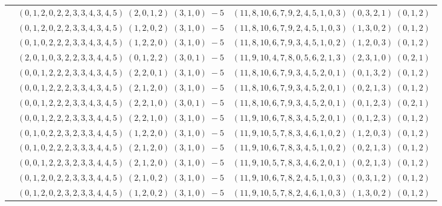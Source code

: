 \documentclass[11pt]{article}
\begin{document}
\begin{longtable}[l]{|c|c|c|}
 \cline{2-3} 
 & $(0 ,1 ,2 ,0 ,2 ,2 ,3 ,3 ,4 ,3 ,4 ,5) \;(2 ,0 ,1 ,2) \;(3 ,1 ,0) \;-5$ & $(11 ,8 ,10 ,6 ,7 ,9 ,2 ,4 ,5 ,1 ,0 ,3) \;(0 ,3 ,2 ,1) \;(0 ,1 ,2) \;$\\ 
 \cline{2-3} 
 & $(0 ,1 ,2 ,0 ,2 ,2 ,3 ,3 ,4 ,3 ,4 ,5) \;(1 ,2 ,0 ,2) \;(3 ,1 ,0) \;-5$ & $(11 ,8 ,10 ,6 ,7 ,9 ,2 ,4 ,5 ,1 ,0 ,3) \;(1 ,3 ,0 ,2) \;(0 ,1 ,2) \;$\\ 
 \cline{2-3} 
 & $(0 ,1 ,0 ,2 ,2 ,2 ,3 ,3 ,4 ,3 ,4 ,5) \;(1 ,2 ,2 ,0) \;(3 ,1 ,0) \;-5$ & $(11 ,8 ,10 ,6 ,7 ,9 ,3 ,4 ,5 ,1 ,0 ,2) \;(1 ,2 ,0 ,3) \;(0 ,1 ,2) \;$\\ 
 \cline{2-3} 
 & $(2 ,0 ,1 ,0 ,3 ,2 ,2 ,3 ,3 ,4 ,4 ,5) \;(0 ,1 ,2 ,2) \;(3 ,0 ,1) \;-5$ & $(11 ,9 ,10 ,4 ,7 ,8 ,0 ,5 ,6 ,2 ,1 ,3) \;(2 ,3 ,1 ,0) \;(0 ,2 ,1) \;$\\ 
 \cline{2-3} 
 & $(0 ,0 ,1 ,2 ,2 ,2 ,3 ,3 ,4 ,3 ,4 ,5) \;(2 ,2 ,0 ,1) \;(3 ,1 ,0) \;-5$ & $(11 ,8 ,10 ,6 ,7 ,9 ,3 ,4 ,5 ,2 ,0 ,1) \;(0 ,1 ,3 ,2) \;(0 ,1 ,2) \;$\\ 
 \cline{2-3} 
 & $(0 ,0 ,1 ,2 ,2 ,2 ,3 ,3 ,4 ,3 ,4 ,5) \;(2 ,1 ,2 ,0) \;(3 ,1 ,0) \;-5$ & $(11 ,8 ,10 ,6 ,7 ,9 ,3 ,4 ,5 ,2 ,0 ,1) \;(0 ,2 ,1 ,3) \;(0 ,1 ,2) \;$\\ 
 \cline{2-3} 
 & $(0 ,0 ,1 ,2 ,2 ,2 ,3 ,3 ,4 ,3 ,4 ,5) \;(2 ,2 ,1 ,0) \;(3 ,0 ,1) \;-5$ & $(11 ,8 ,10 ,6 ,7 ,9 ,3 ,4 ,5 ,2 ,0 ,1) \;(0 ,1 ,2 ,3) \;(0 ,2 ,1) \;$\\ 
 \cline{2-3} 
 & $(0 ,0 ,1 ,2 ,2 ,2 ,3 ,3 ,3 ,4 ,4 ,5) \;(2 ,2 ,1 ,0) \;(3 ,1 ,0) \;-5$ & $(11 ,9 ,10 ,6 ,7 ,8 ,3 ,4 ,5 ,2 ,0 ,1) \;(0 ,1 ,2 ,3) \;(0 ,1 ,2) \;$\\ 
 \cline{2-3} 
 & $(0 ,1 ,0 ,2 ,2 ,3 ,2 ,3 ,3 ,4 ,4 ,5) \;(1 ,2 ,2 ,0) \;(3 ,1 ,0) \;-5$ & $(11 ,9 ,10 ,5 ,7 ,8 ,3 ,4 ,6 ,1 ,0 ,2) \;(1 ,2 ,0 ,3) \;(0 ,1 ,2) \;$\\ 
 \cline{2-3} 
 & $(0 ,1 ,0 ,2 ,2 ,2 ,3 ,3 ,3 ,4 ,4 ,5) \;(2 ,1 ,2 ,0) \;(3 ,1 ,0) \;-5$ & $(11 ,9 ,10 ,6 ,7 ,8 ,3 ,4 ,5 ,1 ,0 ,2) \;(0 ,2 ,1 ,3) \;(0 ,1 ,2) \;$\\ 
 \cline{2-3} 
 & $(0 ,0 ,1 ,2 ,2 ,3 ,2 ,3 ,3 ,4 ,4 ,5) \;(2 ,1 ,2 ,0) \;(3 ,1 ,0) \;-5$ & $(11 ,9 ,10 ,5 ,7 ,8 ,3 ,4 ,6 ,2 ,0 ,1) \;(0 ,2 ,1 ,3) \;(0 ,1 ,2) \;$\\ 
 \cline{2-3} 
 & $(0 ,1 ,2 ,0 ,2 ,2 ,3 ,3 ,3 ,4 ,4 ,5) \;(2 ,1 ,0 ,2) \;(3 ,1 ,0) \;-5$ & $(11 ,9 ,10 ,6 ,7 ,8 ,2 ,4 ,5 ,1 ,0 ,3) \;(0 ,3 ,1 ,2) \;(0 ,1 ,2) \;$\\ 
 \cline{2-3} 
 & $(0 ,1 ,2 ,0 ,2 ,3 ,2 ,3 ,3 ,4 ,4 ,5) \;(1 ,2 ,0 ,2) \;(3 ,1 ,0) \;-5$ & $(11 ,9 ,10 ,5 ,7 ,8 ,2 ,4 ,6 ,1 ,0 ,3) \;(1 ,3 ,0 ,2) \;(0 ,1 ,2) \;$\\ 

\end{longtable}
\end{document}
